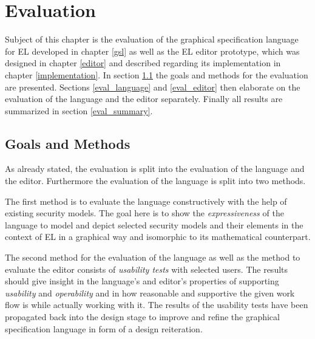 \documentclass[twoside, openright, 12pt]{book}
\begin{document}



\cleardoublepage
\chapter{Evaluation}
\label{evaluation}
Subject of this chapter is the evaluation of the graphical specification language for EL developed in chapter \ref{gsl} as well as the EL editor prototype, which was designed in chapter \ref{editor} and described regarding its implementation in chapter \ref{implementation}.
In section \ref{eval_goals} the goals and methods for the evaluation are presented.
Sections \ref{eval_language} and \ref{eval_editor} then elaborate on the evaluation of the language and the editor separately.
Finally all results are summarized in section \ref{eval_summary}.



\section{Goals and Methods}
\label{eval_goals}
As already stated, the evaluation is split into the evaluation of the language and the editor.
Furthermore the evaluation of the language is split into two methods.

The first method is to evaluate the language constructively with the help of existing security models.
The goal here is to show the \textit{expressiveness} of the language to model and depict selected security models and their elements in the context of EL in a graphical way and isomorphic to its mathematical counterpart.

The second method for the evaluation of the language as well as the method to evaluate the editor consists of \textit{usability tests} with selected users.
The results should give insight in the language's and editor's properties of supporting \textit{usability} and \textit{operability} and in how reasonable and supportive the given work flow is while actually working with it.
The results of the usability tests have been propagated back into the design stage to improve and refine the graphical specification language in form of a design reiteration.
\end{document}
